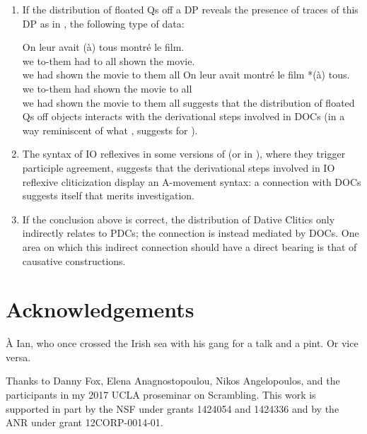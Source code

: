 \documentclass[output=paper]{langsci/langscibook}
\begin{document}
\begin{enumerate}
\item If the distribution of floated Qs off a DP reveals the presence of traces
    of this DP as in  \citet{Sportiche:1988}, the following type of data:

\ea
\ea
	\gll  On leur avait  (\`a) tous montr\'e le film.\\
    we to-them had \hphantom{(}to all shown the movie.\\
    \trans we had shown the movie to them all
\ex
	\gll On leur avait montré le film *(\`a) tous.\\
    we to-them had  shown the movie \hphantom{*(}to all\\
    \trans we had shown the movie to them all
\z
\z
%
suggests that the distribution of floated Qs off objects interacts with the
derivational steps involved in \glspl{DOC} (in a
way reminiscent of what \citealp{Sportiche2017c}, suggests for ).

\item The syntax of IO reflexives in some versions of  (or in ),
    where they trigger participle agreement, suggests that the derivational
    steps involved in IO reflexive cliticization display an A-movement syntax:
    a connection with  \glspl{DOC} suggests itself that merits
    investigation.

\item If the conclusion above is correct, the distribution of  Dative
    Clitics only indirectly relates to \glspl{PDC}; the connection
    is instead mediated by \glspl{DOC}. One area on which this indirect
    connection should have a direct bearing is that of causative constructions.

\end{enumerate}

\printchapterglossary{}

\section*{Acknowledgements}

\`A Ian, who once crossed the Irish sea with his gang for a talk and a pint. Or
vice versa.

Thanks to Danny Fox, Elena Anagnostopoulou, Nikos Angelopoulos, and the
participants in my 2017 UCLA proseminar on Scrambling. This work is supported
in part by the NSF under grants 1424054 and 1424336 and by the ANR under grant
12CORP-0014-01.

{\sloppy
\printbibliography[heading=subbibliography,notkeyword=this]
}
\end{document}
